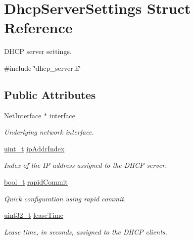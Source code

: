 \hypertarget{structDhcpServerSettings}{}\section{Dhcp\+Server\+Settings Struct Reference}
\label{structDhcpServerSettings}


D\+H\+CP server settings.  




{\ttfamily \#include \char`\"{}dhcp\+\_\+server.\+h\char`\"{}}

\subsection*{Public Attributes}
\begin{DoxyCompactItemize}
\item 
\hyperlink{net_8h_a2234db8911a1148c9159979d8f5e0d6b}{Net\+Interface} $\ast$ \hyperlink{structDhcpServerSettings_a3acdee6074b02512c0abca577e062b26}{interface}
\begin{DoxyCompactList}\small\item\em Underlying network interface. \end{DoxyCompactList}\item 
\hyperlink{compiler__port_8h_a12a1e9b3ce141648783a82445d02b58d}{uint\+\_\+t} \hyperlink{structDhcpServerSettings_aaad90677f7fa180236c4ae488ed076f1}{ip\+Addr\+Index}
\begin{DoxyCompactList}\small\item\em Index of the IP address assigned to the D\+H\+CP server. \end{DoxyCompactList}\item 
\hyperlink{compiler__port_8h_a812d16e5494522586b3784e55d479912}{bool\+\_\+t} \hyperlink{structDhcpServerSettings_a579ebac7fc6a51baa1f70f597309024e}{rapid\+Commit}
\begin{DoxyCompactList}\small\item\em Quick configuration using rapid commit. \end{DoxyCompactList}\item 
\hyperlink{stdint_8h_a435d1572bf3f880d55459d9805097f62}{uint32\+\_\+t} \hyperlink{structDhcpServerSettings_ab2ca89761cb8c1611c0988c4a07d0c54}{lease\+Time}
\begin{DoxyCompactList}\small\item\em Lease time, in seconds, assigned to the D\+H\+CP clients. \end{DoxyCompactList}\item 

\end{DoxyCompactItemize}
